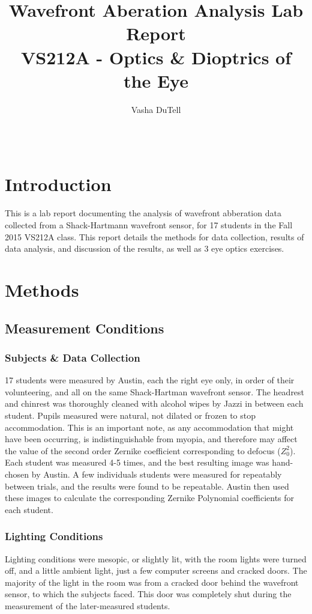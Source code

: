 \documentclass{article}
\title{Wavefront Aberation Analysis Lab Report \\
VS212A - Optics \& Dioptrics of the Eye}
\author{Vasha DuTell}
\begin{document}
\maketitle

\begin{tabular}{lr}
\end{tabular}

\section{Introduction}
This is a lab report documenting the analysis of wavefront abberation data collected from a Shack-Hartmann wavefront sensor, for 17 students in the Fall 2015 VS212A class. This report details the methods for data collection, results of data analysis, and discussion of the results, as well as 3 eye optics exercises. \\

\section{Methods}

\subsection{Measurement Conditions}

\subsubsection{Subjects \& Data Collection} 17 students were measured by Austin, each the right eye only, in order of their volunteering, and all on the same Shack-Hartman wavefront sensor. The headrest and chinrest was thoroughly cleaned with alcohol wipes by Jazzi in between each student. Pupils measured were natural, not dilated or frozen to stop accommodation. This is an important note, as any accommodation that might have been occurring, is indistinguishable from myopia, and therefore may affect the value of the second order Zernike coefficient corresponding to defocus ($Z_0^2$). Each student was measured 4-5 times, and the best resulting image was hand-chosen by Austin. A few individuals students were measured for repeatably between trials, and the results were found to be repeatable. Austin then used these images to calculate the corresponding Zernike Polynomial coefficients for each student.\\


\subsubsection{Lighting Conditions} Lighting conditions were mesopic, or slightly lit, with the room lights were turned off, and a little ambient light, just a few computer screens and cracked doors. The majority of the light in the room was from a cracked door behind the wavefront sensor, to which the subjects faced. This door was completely shut during the measurement of the later-measured students. \\
\end{document}
